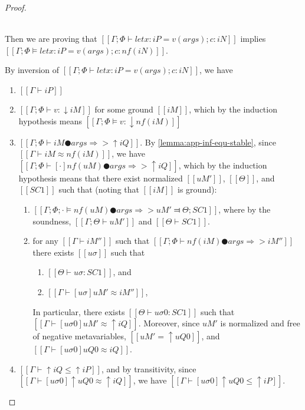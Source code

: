 \begin{proof}
\begin{caseof}
        \item {}\\
            Then we are proving that 
            $[[Γ ; Φ ⊢ let x:iP = v(args); c : iN]]$
            implies 
            $[[Γ; Φ ⊨ let x:iP = v(args); c : nf(iN)]]$.

            By inversion of 
            $[[Γ ; Φ ⊢ let x:iP = v(args); c : iN]]$,
            we have
            \begin{enumerate}
                \item $[[Γ ⊢ iP]]$
                \item $[[Γ ; Φ ⊢ v : ↓iM]]$ for some ground $[[iM]]$,
                    which by the induction hypothesis means
                    $[[Γ ; Φ ⊨ v : ↓nf(iM)]]$
                \item $[[Γ ; Φ ⊢ iM ● args ⇒> ↑iQ]]$. 
                    By \cref{lemma:app-inf-equ-stable}, since
                    $[[Γ ⊢ iM ≈ nf(iM)]]$, we have
                    $[[Γ ; Φ ⊢ [·]nf(uM) ● args ⇒> ↑iQ]]$, 
                    which by the induction hypothesis means 
                    that there exist normalized 
                    $[[uM']]$, $[[Θ]]$, and $[[SC1]]$ such that
                    (noting that $[[iM]]$ is ground):
                    \begin{enumerate}
                        \item $[[ Γ; Φ; · ⊨ nf(uM) ● args ⇒> uM' ⫤ Θ; SC1 ]]$,
                            where by the soundness, $[[Γ; Θ ⊢ uM']]$ and $[[Θ ⊢ SC1]]$.
                        \item for any $[[Γ ⊢ iM'']]$ 
                            such that $[[Γ; Φ ⊢ nf(iM) ● args ⇒> iM'']]$
                            there exists $[[uσ]]$ such that 
                            \begin{enumerate}
                                \item $[[Θ ⊢ uσ : SC1]]$, and 
                                \item $[[Γ ⊢ [uσ]uM' ≈ iM'']]$,
                            \end{enumerate}
                            In particular, there exists
                            $[[Θ ⊢ uσ0 : SC1]]$ such that $[[Γ ⊢ [uσ0]uM' ≈ ↑iQ]]$.
                           Moreover, since $uM'$ is normalized and free of negative metavariables,
                            $[[uM' = ↑uQ0]]$, and $[[Γ ⊢ [uσ0]uQ0 ≈ iQ]]$.
                    \end{enumerate}
                \item $[[Γ ⊢ ↑iQ ≤ ↑iP]]$,
                    and by transitivity, since $[[Γ ⊢ [uσ0]↑uQ0 ≈ ↑iQ]]$,
                    we have $[[Γ ⊢ [uσ0]↑uQ0 ≤ ↑iP]]$.
                    

\end{enumerate}
\end{caseof}
\end{proof}
